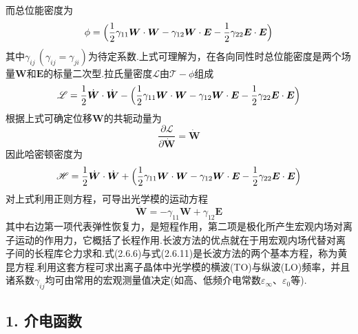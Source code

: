 而总位能密度为
\begin{equation}
  \phi=\Bigl(\frac{1}{2}\gamma_{11}\boldsymbol{W}\cdot\boldsymbol{W}
  -\gamma_{12}\boldsymbol{W}\cdot\boldsymbol{E}
  -\frac{1}{2}\gamma_{22}\boldsymbol{E}\cdot\boldsymbol{E}\Bigr)
\end{equation}
其中$\gamma_{ij}\,(\gamma_{ij}=\gamma_{ji})$为待定系数.上式可理解为，在各向同性时总位能密度是两个场量$\boldsymbol{W}$和$\boldsymbol{E}$的标量二次型.拉氏量密度$\mathscr{L}$由$\mathscr{T}-\phi$组成
\begin{equation}
  \mathscr{L}=\frac{1}{2}\dot{\boldsymbol{W}}\cdot\dot{\boldsymbol{W}}
  -\Bigl(\frac{1}{2}\gamma_{11}\boldsymbol{W}\cdot\boldsymbol{W}
  -\gamma_{12}\boldsymbol{W}\cdot\boldsymbol{E}
  -\frac{1}{2}\gamma_{22}\boldsymbol{E}\cdot\boldsymbol{E}\Bigr)
\end{equation}
根据上式可确定位移$\boldsymbol{W}$的共轭动量为
\begin{equation*}
  \frac{\partial\mathscr{L}}{\partial\dot{\boldsymbol{W}}}=\dot{\boldsymbol{W}}
\end{equation*}
因此哈密顿密度为
\begin{equation}
  \mathscr{H}=\frac{1}{2}\dot{\boldsymbol{W}}\cdot\dot{\boldsymbol{W}}
  +\Bigl(\frac{1}{2}\gamma_{11}\boldsymbol{W}\cdot\boldsymbol{W}
  -\gamma_{12}\boldsymbol{W}\cdot\boldsymbol{E}
  -\frac{1}{2}\gamma_{22}\boldsymbol{E}\cdot\boldsymbol{E}\Bigr)
\end{equation}
对上式利用正则方程，可导出光学模的运动方程
\begin{equation}
  \ddot{\boldsymbol{W}}=-\gamma_{11}\boldsymbol{W}+\gamma_{12}\boldsymbol{E}
\end{equation}
其中右边第一项代表弹性恢复力，是短程作用，第二项是极化所产生宏观内场对离子运动的作用力，它概括了长程作用.长波方法的优点就在于用宏观内场代替对离子间的长程库仑力求和.式(2.6.6)与式(2.6.11)是长波方法的两个基本方程，称为黄昆方程.利用这套方程可求出离子晶体中光学模的横波(TO)与纵波(LO)频率，并且诸系数$\gamma_{ij}$均可由常用的宏观测量值决定(如高、低频介电常数$\varepsilon_{\infty}$、$\varepsilon_0$等).

\subsection*{1. 介电函数}

